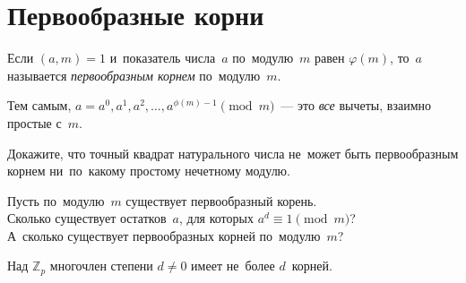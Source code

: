 
\section*{Первообразные корни}


Если $(a, m) = 1$ и~показатель числа~$a$ по~модулю~$m$ равен $\varphi(m)$,
то~$a$ называется \emph{первообразным корнем} по~модулю~$m$.

Тем самым, $a = a^0, a^1, a^2, \ldots, a^{\phi(m) - 1} \pmod{m}$~---
это \emph{все} вычеты, взаимно простые с~$m$.

Докажите, что точный квадрат натурального числа не~может быть первообразным
корнем ни~по~какому простому нечетному модулю.

\begin{problems}

\item
Пусть по~модулю~$m$ существует первообразный корень.
\\
\subproblem
Сколько существует остатков~$a$, для которых $a^d \equiv 1 \pmod m$?
\\
\subproblem
А~сколько существует первообразных корней по~модулю~$m$?

\end{problems}

Над $\mathbb{Z}_p$ многочлен степени $d \neq 0$ имеет не~более $d$~корней.

